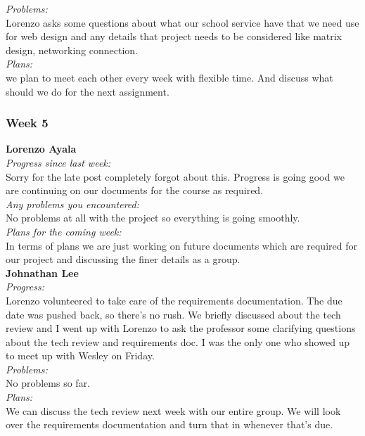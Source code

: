 \noindent\textit{Problems:}\\
\noindent Lorenzo asks some questions about what our school service have that we need use for web design and any details that project needs to be considered like matrix design, networking connection.\\

\noindent\textit{Plans:}\\
\noindent we plan to meet each other every week with flexible time. And discuss what should we do for the next assignment.\\

\subsubsection{Week 5}

\textbf{Lorenzo Ayala}\\
\noindent\textit{Progress since last week:}\\
Sorry for the late post completely forgot about this. Progress is going good we are continuing on our documents for the course as required.\\

\noindent\textit{Any problems you encountered:}\\
\noindent No problems at all with the project so everything is going smoothly.\\

\noindent\textit{Plans for the coming week:}\\
\noindent In terms of plans we are just working on future documents which are required for our project and discussing the finer details as a group.\\

\noindent\textbf{Johnathan Lee}\\
\noindent\textit{Progress:}\\
Lorenzo volunteered to take care of the requirements documentation. The due date was pushed back, so there’s no rush. We briefly discussed about the tech review and I went up with Lorenzo to ask the professor some clarifying questions about the tech review and requirements doc.  I was the only one who showed up to meet up with Wesley on Friday.\\

\noindent\textit{Problems:}\\
\noindent No problems so far.\\

\noindent\textit{Plans:}\\
\noindent We can discuss the tech review next week with our entire group. We will look over the requirements documentation and turn that in whenever that’s due.\\

